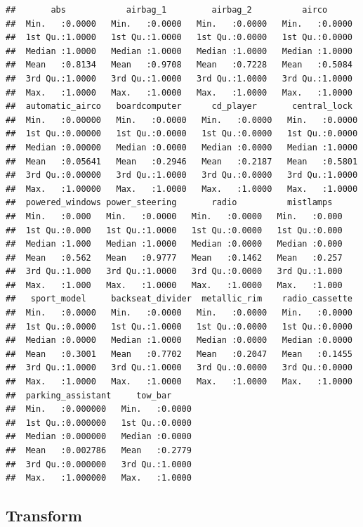 \documentclass[
]{article}
\begin{document}
\begin{verbatim}
##       abs            airbag_1         airbag_2          airco       
##  Min.   :0.0000   Min.   :0.0000   Min.   :0.0000   Min.   :0.0000  
##  1st Qu.:1.0000   1st Qu.:1.0000   1st Qu.:0.0000   1st Qu.:0.0000  
##  Median :1.0000   Median :1.0000   Median :1.0000   Median :1.0000  
##  Mean   :0.8134   Mean   :0.9708   Mean   :0.7228   Mean   :0.5084  
##  3rd Qu.:1.0000   3rd Qu.:1.0000   3rd Qu.:1.0000   3rd Qu.:1.0000  
##  Max.   :1.0000   Max.   :1.0000   Max.   :1.0000   Max.   :1.0000  
##  automatic_airco   boardcomputer      cd_player       central_lock   
##  Min.   :0.00000   Min.   :0.0000   Min.   :0.0000   Min.   :0.0000  
##  1st Qu.:0.00000   1st Qu.:0.0000   1st Qu.:0.0000   1st Qu.:0.0000  
##  Median :0.00000   Median :0.0000   Median :0.0000   Median :1.0000  
##  Mean   :0.05641   Mean   :0.2946   Mean   :0.2187   Mean   :0.5801  
##  3rd Qu.:0.00000   3rd Qu.:1.0000   3rd Qu.:0.0000   3rd Qu.:1.0000  
##  Max.   :1.00000   Max.   :1.0000   Max.   :1.0000   Max.   :1.0000  
##  powered_windows power_steering       radio          mistlamps    
##  Min.   :0.000   Min.   :0.0000   Min.   :0.0000   Min.   :0.000  
##  1st Qu.:0.000   1st Qu.:1.0000   1st Qu.:0.0000   1st Qu.:0.000  
##  Median :1.000   Median :1.0000   Median :0.0000   Median :0.000  
##  Mean   :0.562   Mean   :0.9777   Mean   :0.1462   Mean   :0.257  
##  3rd Qu.:1.000   3rd Qu.:1.0000   3rd Qu.:0.0000   3rd Qu.:1.000  
##  Max.   :1.000   Max.   :1.0000   Max.   :1.0000   Max.   :1.000  
##   sport_model     backseat_divider  metallic_rim    radio_cassette  
##  Min.   :0.0000   Min.   :0.0000   Min.   :0.0000   Min.   :0.0000  
##  1st Qu.:0.0000   1st Qu.:1.0000   1st Qu.:0.0000   1st Qu.:0.0000  
##  Median :0.0000   Median :1.0000   Median :0.0000   Median :0.0000  
##  Mean   :0.3001   Mean   :0.7702   Mean   :0.2047   Mean   :0.1455  
##  3rd Qu.:1.0000   3rd Qu.:1.0000   3rd Qu.:0.0000   3rd Qu.:0.0000  
##  Max.   :1.0000   Max.   :1.0000   Max.   :1.0000   Max.   :1.0000  
##  parking_assistant     tow_bar      
##  Min.   :0.000000   Min.   :0.0000  
##  1st Qu.:0.000000   1st Qu.:0.0000  
##  Median :0.000000   Median :0.0000  
##  Mean   :0.002786   Mean   :0.2779  
##  3rd Qu.:0.000000   3rd Qu.:1.0000  
##  Max.   :1.000000   Max.   :1.0000
\end{verbatim}

\hypertarget{transform-1}{%
\subsection{Transform}\label{transform-1}}
\end{document}
